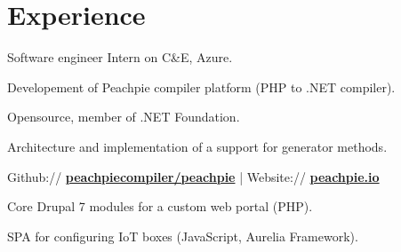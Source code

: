 \documentclass[a4paper]{deedy-resume} %
\begin{document}
\hfill
%
%
\begin{minipage}[t]{0.66\textwidth} %


\section{Experience}


\vspace{\topsep} %
\begin{tightitemize}
	\item Software engineer Intern on C\&E, Azure.
\end{tightitemize}

\sectionspace %



\begin{tightitemize}
\item Developement of Peachpie compiler platform (PHP to .NET compiler).
\item Opensource, member of .NET Foundation.
\item Architecture and implementation of a support for generator methods.
\item Github:// \href{https://github.com/peachpiecompiler/peachpie}{\bf peachpiecompiler/peachpie} | Website:// \href{https://www.peachpie.io/}{\bf peachpie.io}
\end{tightitemize}

\sectionspace %



\begin{tightitemize}
\item Core Drupal 7 modules for a custom web portal (PHP).
\item SPA for configuring IoT boxes (JavaScript, Aurelia Framework).
\end{tightitemize}


\end{minipage}
\end{document}
